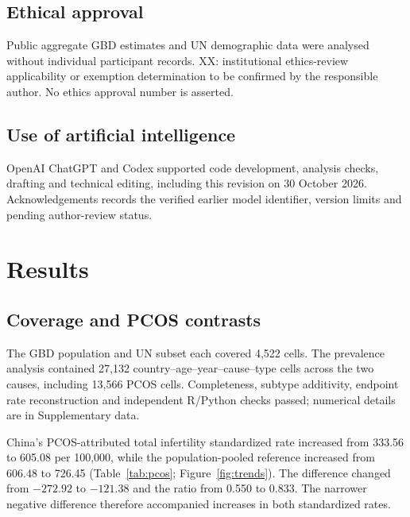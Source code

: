 \documentclass[11pt,a4paper]{article}
\begin{document}
\subsection{Ethical approval}
Public aggregate GBD estimates and UN demographic data were analysed without individual participant records. XX: institutional ethics-review applicability or exemption determination to be confirmed by the responsible author. No ethics approval number is asserted.

\subsection{Use of artificial intelligence}
OpenAI ChatGPT and Codex supported code development, analysis checks, drafting and technical editing, including this revision on 30 October 2026. Acknowledgements records the verified earlier model identifier, version limits and pending author-review status.

\section{Results}
\subsection{Coverage and PCOS contrasts}
The GBD population and UN subset each covered 4,522 cells. The prevalence analysis contained 27,132 country--age--year--cause--type cells across the two causes, including 13,566 PCOS cells. Completeness, subtype additivity, endpoint rate reconstruction and independent R/Python checks passed; numerical details are in Supplementary data.

China's PCOS-attributed total infertility standardized rate increased from 333.56 to 605.08 per 100,000, while the population-pooled reference increased from 606.48 to 726.45 (Table~\ref{tab:pcos}; Figure~\ref{fig:trends}). The difference changed from $-272.92$ to $-121.38$ and the ratio from 0.550 to 0.833. The narrower negative difference therefore accompanied increases in both standardized rates.
\end{document}
